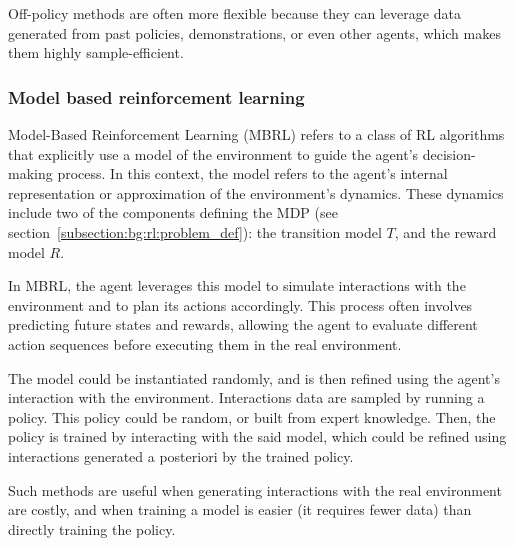 Off-policy methods are often more flexible because they can leverage data generated from past policies, demonstrations,
or even other agents, which makes them highly sample-efficient.

\subsubsection{Model based reinforcement learning}

Model-Based Reinforcement Learning (MBRL) refers to a class of RL algorithms that explicitly
use a model of the environment to guide the agent's decision-making process.
In this context, the model refers to the agent's internal representation or approximation of the environment's dynamics.
These dynamics include two of the components defining the MDP (see section~\ref{subsection:bg:rl:problem_def}): the transition model $T$,
and the reward model $R$.

In MBRL, the agent leverages this model to simulate interactions with the environment and to plan its actions accordingly.
This process often involves predicting future states and rewards, allowing the agent to evaluate different action
sequences before executing them in the real environment.

The model could be instantiated randomly, and is then refined using the agent's interaction with the environment.
Interactions data are sampled by running a policy.
This policy could be random, or built from expert knowledge.
Then, the policy is trained by interacting with the said model, which could be refined using interactions generated a
posteriori by the trained policy.

Such methods are useful when generating interactions with the real environment are costly, and when training a model
is easier (it requires fewer data) than directly training the policy.




